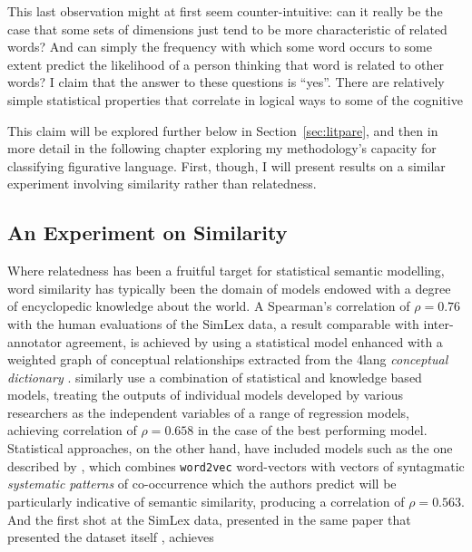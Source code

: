This last observation might at first seem counter-intuitive: can it really be the case that some sets of dimensions just tend to be more characteristic of related words?  And can simply the frequency with which some word occurs to some extent predict the likelihood of a person thinking that word is related to other words?  I claim that the answer to these questions is ``yes''.  There are relatively simple statistical properties that correlate in logical ways to some of the cognitive 

This claim will be explored further below in Section~\ref{sec:litpare}, and then in more detail in the following chapter exploring my methodology's capacity for classifying figurative language.  First, though, I will present results on a similar experiment involving similarity rather than relatedness.

\subsection{An Experiment on Similarity}
Where relatedness has been a fruitful target for statistical semantic modelling, word similarity has typically been the domain of models endowed with a degree of encyclopedic knowledge about the world.  A Spearman's correlation of $\rho = 0.76$ with the human evaluations of the SimLex data, a result comparable with inter-annotator agreement, is achieved by \cite{RecksiEA2016} using a statistical model enhanced with a weighted graph of conceptual relationships extracted from the 4lang \emph{conceptual dictionary} \citep{KornaiEA2015}.  \cite{BanjadeEA2015} similarly use a combination of statistical and knowledge based models, treating the outputs of individual models developed by various researchers as the independent variables of a range of regression models, achieving correlation of $\rho = 0.658$ in the case of the best performing model.  Statistical approaches, on the other hand, have included models such as the one described by \cite{SchwartzEA2015}, which combines \texttt{word2vec} word-vectors with vectors of syntagmatic \emph{systematic patterns} of co-occurrence which the authors predict will be particularly indicative of semantic similarity, producing a correlation of $\rho = 0.563$.  And the first shot at the SimLex data, presented in the same paper that presented the dataset itself \citep{HillEA2015}, achieves


